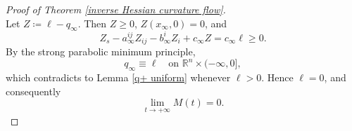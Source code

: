 \documentclass[reqno]{amsart}
\theoremstyle{remark}
\theoremstyle{definition}
\numberwithin{equation}{section}
\begin{document}
\begin{proof}[Proof of Theorem \ref{inverse Hessian curvature flow}]
\[    \]
    Let $Z\coloneqq \ell-q_\infty$. Then $Z\geqslant 0$, $Z(x_\infty,0)=0$, and
    \[
    Z_s-a_\infty^{ij}Z_{ij}-b_\infty^iZ_i+c_\infty Z=c_\infty\ell\geqslant 0.
    \]
    By the strong parabolic minimum principle,
    \[
    q_\infty\equiv\ell \quad \text{on } \mathbb R^n\times(-\infty,0],
    \]
    which contradicts to Lemma \ref{q+ uniform} whenever $\ell>0$. Hence $\ell=0$, and consequently
    \[
    \lim_{t\to+\infty}M(t)=0.
    \]


\end{proof}
\end{document}
